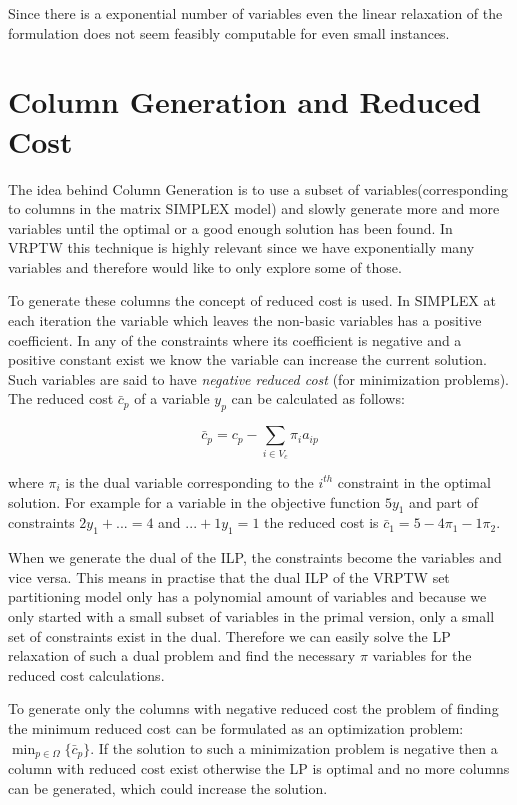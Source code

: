 Since there is a exponential number of variables even the linear relaxation of the formulation does not seem feasibly computable for even small instances.

\section{Column Generation and Reduced Cost}
The idea behind Column Generation is to use a subset of variables(corresponding to columns in the matrix SIMPLEX model) and slowly generate more and more variables until the optimal or a good enough solution has been found. In VRPTW this technique is highly relevant since we have exponentially many variables and therefore would like to only explore some of those.

To generate these columns the concept of reduced cost is used. In SIMPLEX at each iteration the variable which leaves the non-basic variables has a positive coefficient. In any of the constraints where its coefficient is negative and a positive constant exist we know the variable can increase the current solution. Such variables are said to have \textit{negative reduced cost} (for minimization problems). The reduced cost $\bar{c}_p$ of a variable $y_p$ can be calculated as follows:

 $$\bar{c}_p = c_p - \sum_{i \in V_c} \pi_i a_{ip}$$
 
where $\pi_i$ is the dual variable corresponding to the $i^{th}$ constraint in the optimal solution. For example for a variable in the objective function $5y_1$ and part of constraints $2y_1 + ... = 4$ and $... + 1y_1 = 1$ the reduced cost is $\bar{c}_1 = 5 - 4 \pi_1 - 1 \pi_2$. 

When we generate the dual of the ILP, the constraints become the variables and vice versa. This means in practise that the dual ILP of the VRPTW set partitioning model only has a polynomial amount of variables and because we only started with a small subset of variables in the primal version, only a small set of constraints exist in the dual. Therefore we can easily solve the LP relaxation of such a dual problem and find the necessary $\pi$ variables for the reduced cost calculations.

To generate only the columns with negative reduced cost the problem of finding the minimum reduced cost can be formulated as an optimization problem: $\displaystyle \min_{p\in \Omega} \{\bar{c}_p\}$. If the solution to such a minimization problem is negative then a column with reduced cost exist otherwise the LP is optimal and no more columns can be generated, which could increase the solution. 

